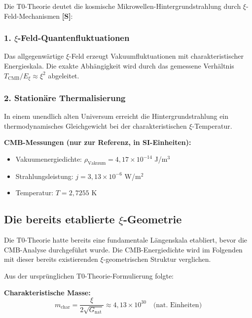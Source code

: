 	Die T0-Theorie deutet die kosmische Mikrowellen-Hintergrundstrahlung durch $\xi$-Feld-Mechanismen \textbf{[S]}:
	
	\subsubsection{1. $\xi$-Feld-Quantenfluktuationen}
	Das allgegenwärtige $\xi$-Feld erzeugt Vakuumfluktuationen mit charakteristischer Energieskala. Die exakte Abhängigkeit wird durch das gemessene Verhältnis $T_{\text{CMB}}/E_\xi \approx \xi^2$ abgeleitet.
	
	\subsubsection{2. Stationäre Thermalisierung}
	In einem unendlich alten Universum erreicht die Hintergrundstrahlung ein thermodynamisches Gleichgewicht bei der charakteristischen $\xi$-Temperatur.
	
	\begin{sibox}
		\textbf{CMB-Messungen (nur zur Referenz, in SI-Einheiten):}
		\begin{itemize}
			\item Vakuumenergiedichte: $\rho_{\text{Vakuum}} = 4,17 \times 10^{-14}$ J/m$^3$
			\item Strahlungsleistung: $j = 3,13 \times 10^{-6}$ W/m$^2$
			\item Temperatur: $T = 2,7255$ K
		\end{itemize}
	\end{sibox}
	
	\subsection{Die bereits etablierte $\xi$-Geometrie}
	
	\begin{important}
		Die T0-Theorie hatte bereits eine fundamentale Längenskala etabliert, bevor die CMB-Analyse durchgeführt wurde. Die CMB-Energiedichte wird im Folgenden mit dieser bereits existierenden $\xi$-geometrischen Struktur verglichen.
	\end{important}
	
	Aus der ursprünglichen T0-Theorie-Formulierung folgte:
	
	\textbf{Charakteristische Masse:}
	\begin{equation}
		m_{\text{char}} = \frac{\xi}{2\sqrt{G_{\text{nat}}}} \approx 4,13 \times 10^{30} \quad \text{(nat. Einheiten)}
	\end{equation}
	
